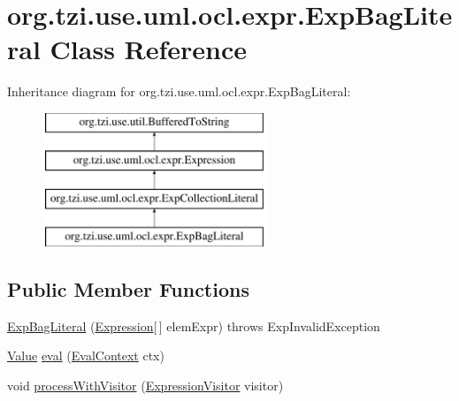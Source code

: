 \hypertarget{classorg_1_1tzi_1_1use_1_1uml_1_1ocl_1_1expr_1_1_exp_bag_literal}{\section{org.\-tzi.\-use.\-uml.\-ocl.\-expr.\-Exp\-Bag\-Literal Class Reference}
\label{classorg_1_1tzi_1_1use_1_1uml_1_1ocl_1_1expr_1_1_exp_bag_literal}
}
Inheritance diagram for org.\-tzi.\-use.\-uml.\-ocl.\-expr.\-Exp\-Bag\-Literal\-:\begin{figure}[H]
\begin{center}
\leavevmode
\includegraphics[height=4.000000cm]{classorg_1_1tzi_1_1use_1_1uml_1_1ocl_1_1expr_1_1_exp_bag_literal}
\end{center}
\end{figure}
\subsection*{Public Member Functions}
\begin{DoxyCompactItemize}
\item 
\hyperlink{classorg_1_1tzi_1_1use_1_1uml_1_1ocl_1_1expr_1_1_exp_bag_literal_aa0f81f35d2e00f92009e859869f35324}{Exp\-Bag\-Literal} (\hyperlink{classorg_1_1tzi_1_1use_1_1uml_1_1ocl_1_1expr_1_1_expression}{Expression}\mbox{[}$\,$\mbox{]} elem\-Expr)  throws Exp\-Invalid\-Exception     
\item 
\hyperlink{classorg_1_1tzi_1_1use_1_1uml_1_1ocl_1_1value_1_1_value}{Value} \hyperlink{classorg_1_1tzi_1_1use_1_1uml_1_1ocl_1_1expr_1_1_exp_bag_literal_a0071a2b656b23ddd0ef2d779e7d0bb24}{eval} (\hyperlink{classorg_1_1tzi_1_1use_1_1uml_1_1ocl_1_1expr_1_1_eval_context}{Eval\-Context} ctx)
\item 
void \hyperlink{classorg_1_1tzi_1_1use_1_1uml_1_1ocl_1_1expr_1_1_exp_bag_literal_a6e4abce2d6181c0dde92b75768d11f64}{process\-With\-Visitor} (\hyperlink{interfaceorg_1_1tzi_1_1use_1_1uml_1_1ocl_1_1expr_1_1_expression_visitor}{Expression\-Visitor} visitor)
\end{DoxyCompactItemize}
